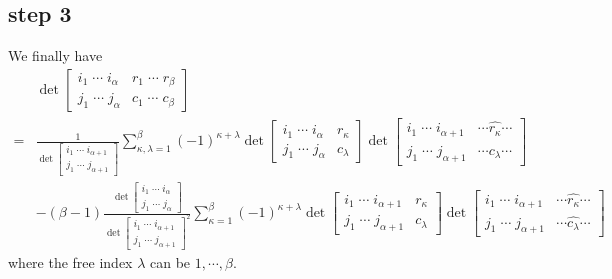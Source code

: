 \documentclass{amsart}
\begin{document}
{    \subsection{step 3}
    {
        We finally have 
        \begin{align}
            &\det\begin{bmatrix}
                i_1\;\cdots\;i_\alpha&r_1\;\cdots\;r_\beta\\
                j_1\;\cdots\;j_\alpha&c_1\;\cdots\;c_\beta
            \end{bmatrix}\\
            ={}&\frac{1}{\det\begin{bmatrix}
                i_1\;\cdots\;i_{\alpha+1}\\
                j_1\;\cdots\;j_{\alpha+1}
            \end{bmatrix}}\sum_{\kappa,\lambda=1}^\beta(-1)^{\kappa+\lambda}\det\begin{bmatrix}
                i_1\;\cdots\;i_\alpha&r_\kappa\\
                j_1\;\cdots\;j_\alpha&c_\lambda
            \end{bmatrix}\det\begin{bmatrix}
                i_1\;\cdots\;i_{\alpha+1}&\cdots\widehat{r_\kappa}\cdots\\
                j_1\;\cdots\;j_{\alpha+1}&\cdots\widehat{c_\lambda}\cdots
            \end{bmatrix}\\
            &-(\beta-1)\frac{\det\begin{bmatrix}
                i_1\;\cdots\;i_\alpha\\
                j_1\;\cdots\;j_\alpha
            \end{bmatrix}}{\det\begin{bmatrix}
                i_1\;\cdots\;i_{\alpha+1}\\
                j_1\;\cdots\;j_{\alpha+1}
            \end{bmatrix}^2}\sum_{\kappa=1}^\beta(-1)^{\kappa+\lambda}\det\begin{bmatrix}
                i_1\;\cdots\;i_{\alpha+1}&r_\kappa\\
                j_1\;\cdots\;j_{\alpha+1}&c_\lambda
            \end{bmatrix}\det\begin{bmatrix}
                i_1\;\cdots\;i_{\alpha+1}&\cdots\widehat{r_\kappa}\cdots\\
                j_1\;\cdots\;j_{\alpha+1}&\cdots\widehat{c_\lambda}\cdots
            \end{bmatrix}
        \end{align}
        where the free index $\lambda$ can be $1,\cdots,\beta$. 
    }
}
\end{document}
